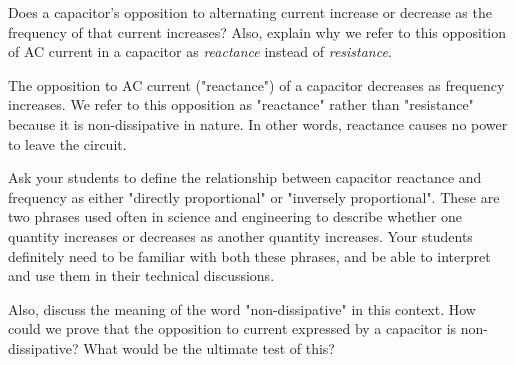 

Does a capacitor's opposition to alternating current increase or decrease as the frequency of that current increases?  Also, explain why we refer to this opposition of AC current in a capacitor as {\it reactance} instead of {\it resistance}.







The opposition to AC current ("reactance") of a capacitor decreases as frequency increases.  We refer to this opposition as "reactance" rather than "resistance" because it is non-dissipative in nature.  In other words, reactance causes no power to leave the circuit.







Ask your students to define the relationship between capacitor reactance and frequency as either "directly proportional" or "inversely proportional".  These are two phrases used often in science and engineering to describe whether one quantity increases or decreases as another quantity increases.  Your students definitely need to be familiar with both these phrases, and be able to interpret and use them in their technical discussions.  

Also, discuss the meaning of the word "non-dissipative" in this context.  How could we prove that the opposition to current expressed by a capacitor is non-dissipative?  What would be the ultimate test of this?




